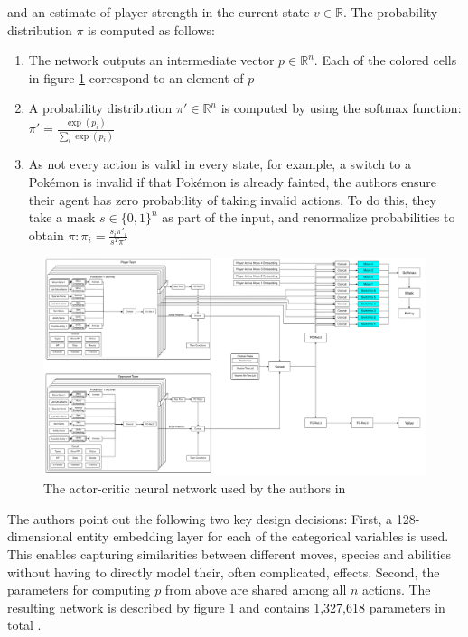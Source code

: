 and an estimate of player strength in the current state $v \in \mathbb{R}$. The probability distribution
$\pi$ is computed as follows:
\begin{enumerate}
    \item The network outputs an intermediate vector $p \in \mathbb{R}^n$. Each of the colored cells in
    figure \ref{fig:lee-network} correspond to an element of $p$
    \item A probability distribution $\pi' \in \mathbb{R}^n$ is computed by using the
    softmax function: $\pi' = \frac{\exp(p_i)}{\sum_i \exp(p_i)}$
    \item As not every action is valid in every state, for example, a switch to a Pokémon is invalid
    if that Pokémon is already fainted, the authors ensure their agent has zero probability of taking
    invalid actions. To do this, they take a mask $s \in \{0, 1\}^n$ as part of the input, and 
    renormalize probabilities to obtain $\pi: \pi_i = \frac{s_i \pi'_i}{s^T \pi'}$
\end{enumerate}
\begin{figure}
	\centering
	\includegraphics[width=1\textwidth]{images/RL-Network-Structure.png}
	\caption{The actor-critic neural network used by the authors in \cite{Huang_Lee_2019}}
	\label{fig:lee-network}
\end{figure}
The authors point out the following two key design decisions: First, a 128-dimensional entity embedding layer
for each of the categorical variables is used. This enables capturing similarities between different moves,
species and abilities without having to directly model their, often complicated, effects. Second, the
parameters for computing $p$ from above are shared among all $n$ actions. The resulting network is described
by figure \ref{fig:lee-network} and contains 1,327,618 parameters in total \cite{Huang_Lee_2019}.

